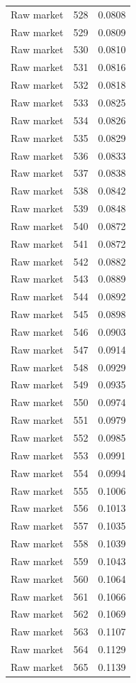 \begin{table}[htbp]
\begin{tabular}{lll}
Raw market & 528 & 0.0808 \\
Raw market & 529 & 0.0809 \\
Raw market & 530 & 0.0810 \\
Raw market & 531 & 0.0816 \\
Raw market & 532 & 0.0818 \\
Raw market & 533 & 0.0825 \\
Raw market & 534 & 0.0826 \\
Raw market & 535 & 0.0829 \\
Raw market & 536 & 0.0833 \\
Raw market & 537 & 0.0838 \\
Raw market & 538 & 0.0842 \\
Raw market & 539 & 0.0848 \\
Raw market & 540 & 0.0872 \\
Raw market & 541 & 0.0872 \\
Raw market & 542 & 0.0882 \\
Raw market & 543 & 0.0889 \\
Raw market & 544 & 0.0892 \\
Raw market & 545 & 0.0898 \\
Raw market & 546 & 0.0903 \\
Raw market & 547 & 0.0914 \\
Raw market & 548 & 0.0929 \\
Raw market & 549 & 0.0935 \\
Raw market & 550 & 0.0974 \\
Raw market & 551 & 0.0979 \\
Raw market & 552 & 0.0985 \\
Raw market & 553 & 0.0991 \\
Raw market & 554 & 0.0994 \\
Raw market & 555 & 0.1006 \\
Raw market & 556 & 0.1013 \\
Raw market & 557 & 0.1035 \\
Raw market & 558 & 0.1039 \\
Raw market & 559 & 0.1043 \\
Raw market & 560 & 0.1064 \\
Raw market & 561 & 0.1066 \\
Raw market & 562 & 0.1069 \\
Raw market & 563 & 0.1107 \\
Raw market & 564 & 0.1129 \\
Raw market & 565 & 0.1139 \\

\end{tabular}
\end{table}
